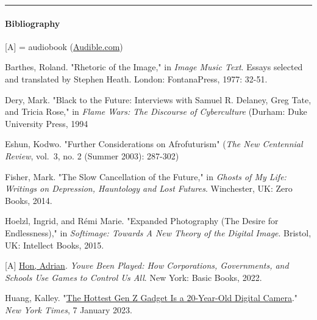 \documentclass[
  letterpaper,
  DIV=11,
  numbers=noendperiod]{scrartcl}
\let\oldparagraph\paragraph
\renewcommand{\paragraph}[1]{\oldparagraph{#1}\mbox{}}
\begin{document}
\begin{center}\rule{0.5\linewidth}{0.5pt}\end{center}

\hypertarget{bibliography}{%
\paragraph{\texorpdfstring{\textbf{Bibliography}}{Bibliography}}\label{bibliography}}

{[}A{]} = audiobook (\href{http://audible.com/}{Audible.com})

Barthes, Roland. "Rhetoric of the Image," in \emph{Image Music Text}.
Essays selected and translated by Stephen Heath. London: FontanaPress,
1977: 32-51.

Dery, Mark. "Black to the Future: Interviews with Samuel R. Delaney,
Greg Tate, and Tricia Rose," in \emph{Flame Wars: The Discourse of
Cyberculture} (Durham: Duke University Press, 1994

Eshun, Kodwo. "Further Considerations on Afrofuturism" (\emph{The New
Centennial Review}, vol.~3, no. 2 (Summer 2003): 287-302)

Fisher, Mark. "\textquotesingle The Slow Cancellation of the
Future,\textquotesingle" in \emph{Ghosts of My Life: Writings on
Depression, Hauntology and Lost Futures}. Winchester, UK: Zero Books,
2014.

Hoelzl, Ingrid, and Rémi Marie. "Expanded Photography (The Desire for
Endlessness)," in \emph{Softimage: Towards A New Theory of the Digital
Image}. Bristol, UK: Intellect Books, 2015.

{[}A{]} \href{https://mssv.net/}{Hon, Adrian}.
\emph{You\textquotesingle ve Been Played: How Corporations, Governments,
and Schools Use Games to Control Us All}. New York: Basic Books, 2022.

Huang, Kalley.
"\href{https://www.nytimes.com/2023/01/07/technology/digital-cameras-olympus-canon.html?fbclid=IwAR1X2DutHJgtJFKB6XdcFjbm3kFB9P-IXPT7HckeGErsOrk0jTVGxugXYzk\&referringSource=articleShare\&smid=nytcore-ios-share\&unlocked_article_code=AAAAAAAAAAAAAAAACEIPuonUktbfqIhkSVUbBCbJUNMnqBqCgvfeh7A9iX7iJSzQQj9Hwv4cGM2H_1bIfbd4ItA62TOdAt9dNbtlDNpD8thiBW0_AQ-5vsnD350fPyQ-rY_0Dm9qhMvBUL59-jTjPizkd7wmgezgtErDOzbvUaLc2CB2LF1isoIlIQ_xoQEAxqjPGuB009hsj7x2Vt0hG2B2NGTdtOLoCh5_JNyFchjZjwE8UOhdUjzQ9sWOv_NCKE4BTAKbEw4spDo0-9heO9kIPa7gLBZGeMv2gLoZD2cAP55OPFabG3prPPkN94E3_vHG}{The
Hottest Gen Z Gadget Is a 20-Year-Old Digital Camera}." \emph{New York
Times}, 7 January 2023.
\end{document}
